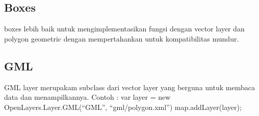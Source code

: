 \documentclass{article}
\begin{document}
\subsection {Boxes}
boxes lebih baik untuk mengimplementasikan fungsi dengan vector layer dan polygon geometric dengan mempertahankan untuk kompatibilitas mundur.

\subsection {GML}
GML layer merupakam subclass dari vector layer yang berguna untuk membaca data dan menampilkannya. 
Contoh :
var layer = new OpenLayers.Layer.GML(“GML”, “gml/polygon.xml”)
map.addLayer(layer);
\end{document}
